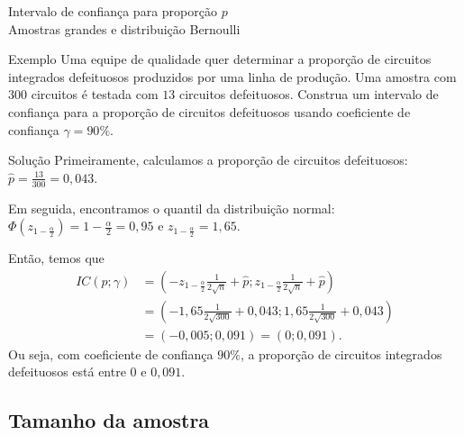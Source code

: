 \documentclass[8pt]{beamer}
\begin{document}
\begin{frame}{Intervalo de confiança para proporção $p$\\ Amostras grandes e distribuição Bernoulli}

\small

\begin{block}{Exemplo}
	Uma equipe de qualidade quer determinar a proporção de circuitos integrados defeituosos produzidos por uma linha de produção. Uma amostra com $300$ circuitos é testada com $13$ circuitos defeituosos. Construa um intervalo de confiança para a proporção de circuitos defeituosos usando coeficiente de confiança $\gamma=90\%$.
\end{block}

\begin{block}{Solução}
	Primeiramente, calculamos a proporção de circuitos defeituosos: $\hat{p} = \frac{13}{300} = 0,043$. 
	
	Em seguida, encontramos o quantil da distribuição normal: $\Phi(z_{1-\frac{\alpha}{2}}) = 1 - \frac{\alpha}{2} = 0,95$ e $z_{1-\frac{\alpha}{2}} = 1,65$.
	
	Então, temos que
	\begin{align*}
		IC(p; \gamma) &= \left( - z_{1-\frac{\alpha}{2}} \frac{1}{2\sqrt{n}} + \hat{p}; z_{1-\frac{\alpha}{2}} \frac{1}{2\sqrt{n}} + \hat{p} \right) \\
		&=\left( -1,65 \frac{1}{2\sqrt{300}} + 0,043; 1,65 \frac{1}{2\sqrt{300}} + 0,043 \right)\\
		&= \left( -0,005; 0,091 \right) = (0; 0,091).
	\end{align*}
	Ou seja, com coeficiente de confiança $90\%$, a proporção de circuitos integrados defeituosos está entre $0$ e $0,091$.
\end{block}

\end{frame}

\subsection{Tamanho da amostra}
\end{document}
